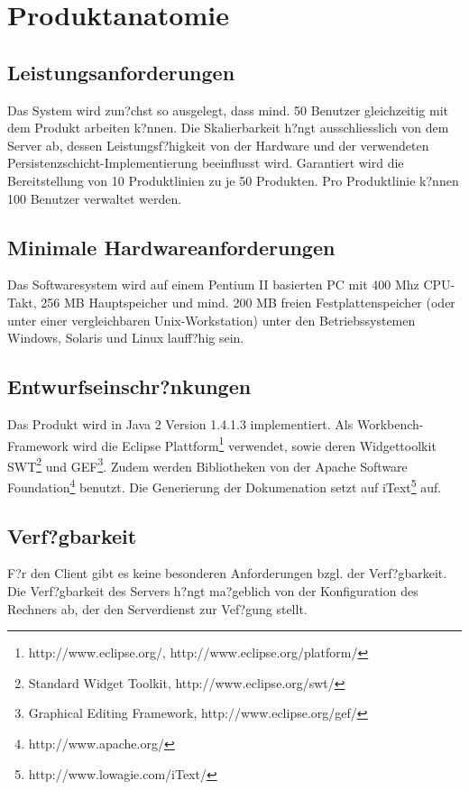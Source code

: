 \chapter{Produktanatomie}

\section{Leistungsanforderungen}
Das System wird zun?chst so ausgelegt, dass mind. 50 Benutzer gleichzeitig mit dem Produkt arbeiten k?nnen.
Die Skalierbarkeit h?ngt ausschliesslich von dem Server ab, dessen Leistungsf?higkeit von der Hardware und
der verwendeten Persistenzschicht-Implementierung beeinflusst wird. Garantiert wird die Bereitstellung von 
10 Produktlinien zu je 50 Produkten. Pro Produktlinie k?nnen 100 Benutzer verwaltet werden.

\section{Minimale Hardwareanforderungen}
Das Softwaresystem wird auf einem Pentium II basierten PC mit 400 Mhz CPU-Takt, 256 MB Hauptspeicher
und mind. 200 MB freien Festplattenspeicher (oder unter einer vergleichbaren Unix-Workstation)
unter den Betriebssystemen Windows, Solaris und Linux lauff?hig sein.

\section{Entwurfseinschr?nkungen}
Das Produkt wird in Java 2 Version 1.4.1.3 implementiert. Als Workbench-Framework wird die 
Eclipse Plattform\footnote{http://www.eclipse.org/, http://www.eclipse.org/platform/}
verwendet, sowie deren Widgettoolkit SWT\footnote{Standard Widget Toolkit, http://www.eclipse.org/swt/}
und GEF\footnote{Graphical Editing Framework, http://www.eclipse.org/gef/}.
Zudem werden Bibliotheken von der Apache Software
Foundation\footnote{http://www.apache.org/} benutzt. Die
Generierung der Dokumenation setzt auf iText\footnote{http://www.lowagie.com/iText/} auf.

\section{Verf?gbarkeit}
F?r den Client gibt es keine besonderen Anforderungen bzgl. der Verf?gbarkeit. Die Verf?gbarkeit des Servers
h?ngt ma?geblich von der Konfiguration des Rechners ab, der den Serverdienst zur Vef?gung stellt.

